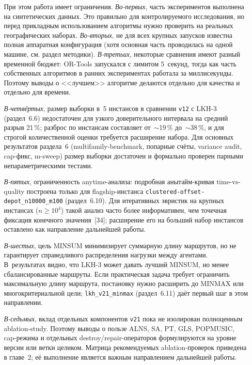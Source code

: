 \documentclass[14pt,a4paper]{extarticle}
\newcommand{\source}[1]{[#1]}
\begin{document}
При этом работа имеет ограничения. \textit{Во-первых}, часть экспериментов выполнена на синтетических данных. Это правильно для контролируемого исследования, но перед прикладным использованием алгоритмы нужно проверить на реальных географических наборах. \textit{Во-вторых}, не для всех крупных запусков известна полная аппаратная конфигурация (хотя основная часть проводилась на одной машине, см. раздел методики). \textit{В-третьих}, некоторые сравнения имеют разный временной бюджет: OR-Tools запускался с лимитом 5~секунд, тогда как часть собственных алгоритмов в ранних экспериментах работала за миллисекунды. Поэтому выводы о <<лучшем>> алгоритме делаются отдельно для качества и отдельно для времени.

\textit{В-четвёртых}, размер выборки в~5 инстансов в сравнении \texttt{v12} с LKH-3 (раздел~6.6) недостаточен для узкого доверительного интервала на средний разрыв 21\,\%; разброс по инстансам составляет от~$\sim$19\,\% до~$\sim$38\,\%, и для строгой количественной оценки требуется расширение набора. Для основных результатов раздела~6 (multifamily-benchmark, попарные счёты, variance audit, cap-фикс, m-sweep) размер выборки достаточен и формально проверен парными непараметрическими тестами.

\textit{В-пятых}, ограниченность anytime-анализа: подробная анытайм-кривая time-vs-quality построена только для flagship-инстанса \texttt{clustered-offset-depot\_n10000\_m100} (раздел~6.10). Для итеративных эвристик на крупных инстансах ($n \geq 10^4$) такой анализ часто более информативен, чем точечная фиксация конечного значения~\source{34}; расширение его на больший набор инстансов оставлено как направление дальнейшей работы.

\textit{В-шестых}, цель MINSUM минимизирует суммарную длину маршрутов, но не гарантирует справедливого распределения нагрузки между агентами. В~результатах видно, что LKH-3 может давать лучший MINSUM, но менее сбалансированные маршруты. Если практическая задача требует ограничить максимальную длину маршрута, постановку нужно расширить до MINMAX или многокритериальной цели; \texttt{lkh\_v21\_minmax} (раздел~6.11) даёт первый шаг в этом направлении.

\textit{В-седьмых}, вклад отдельных компонентов \texttt{v21} пока не изолирован полноценным ablation-study. Поэтому выводы о пользе ALNS, SA, PT, GLS, POPMUSIC, cap-режима и отдельных destroy/repair-операторов формулируются на уровне версии или ветки целиком. Матрица рекомендуемых ablation-проверок приведена в главе~2; её выполнение является важным направлением дальнейшей работы.
\end{document}
